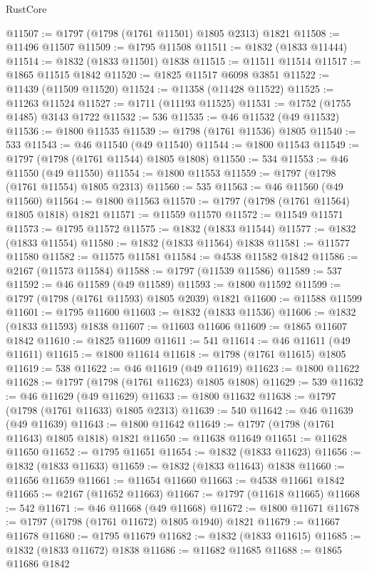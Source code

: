 \begin{lexlean}{RustCore}
\begin{coremodule}
@11507 := @1797 (@1798 (@1761 @11501) @1805 @2313) @1821
@11508 := @11496 @11507
@11509 := @1795 @11508
@11511 := @1832 (@1833 @11444)
@11514 := @1832 (@1833 @11501) @1838
@11515 := @11511 @11514
@11517 := @1865 @11515 @1842
@11520 := @1825 @11517 @6098 @3851
@11522 := @11439 (@11509 @11520)
@11524 := @11358 (@11428 @11522)
@11525 := @11263 @11524
@11527 := @1711 (@11193 @11525)
@11531 := @1752 (@1755 @1485) @3143 @1722
@11532 := 536
@11535 := @46 @11532 (@49 @11532)
@11536 := @1800 @11535
@11539 := @1798 (@1761 @11536) @1805
@11540 := 533
@11543 := @46 @11540 (@49 @11540)
@11544 := @1800 @11543
@11549 := @1797 (@1798 (@1761 @11544) @1805 @1808)
@11550 := 534
@11553 := @46 @11550 (@49 @11550)
@11554 := @1800 @11553
@11559 := @1797 (@1798 (@1761 @11554) @1805 @2313)
@11560 := 535
@11563 := @46 @11560 (@49 @11560)
@11564 := @1800 @11563
@11570 := @1797 (@1798 (@1761 @11564) @1805 @1818) @1821
@11571 := @11559 @11570
@11572 := @11549 @11571
@11573 := @1795 @11572
@11575 := @1832 (@1833 @11544)
@11577 := @1832 (@1833 @11554)
@11580 := @1832 (@1833 @11564) @1838
@11581 := @11577 @11580
@11582 := @11575 @11581
@11584 := @4538 @11582 @1842
@11586 := @2167 (@11573 @11584)
@11588 := @1797 (@11539 @11586)
@11589 := 537
@11592 := @46 @11589 (@49 @11589)
@11593 := @1800 @11592
@11599 := @1797 (@1798 (@1761 @11593) @1805 @2039) @1821
@11600 := @11588 @11599
@11601 := @1795 @11600
@11603 := @1832 (@1833 @11536)
@11606 := @1832 (@1833 @11593) @1838
@11607 := @11603 @11606
@11609 := @1865 @11607 @1842
@11610 := @1825 @11609
@11611 := 541
@11614 := @46 @11611 (@49 @11611)
@11615 := @1800 @11614
@11618 := @1798 (@1761 @11615) @1805
@11619 := 538
@11622 := @46 @11619 (@49 @11619)
@11623 := @1800 @11622
@11628 := @1797 (@1798 (@1761 @11623) @1805 @1808)
@11629 := 539
@11632 := @46 @11629 (@49 @11629)
@11633 := @1800 @11632
@11638 := @1797 (@1798 (@1761 @11633) @1805 @2313)
@11639 := 540
@11642 := @46 @11639 (@49 @11639)
@11643 := @1800 @11642
@11649 := @1797 (@1798 (@1761 @11643) @1805 @1818) @1821
@11650 := @11638 @11649
@11651 := @11628 @11650
@11652 := @1795 @11651
@11654 := @1832 (@1833 @11623)
@11656 := @1832 (@1833 @11633)
@11659 := @1832 (@1833 @11643) @1838
@11660 := @11656 @11659
@11661 := @11654 @11660
@11663 := @4538 @11661 @1842
@11665 := @2167 (@11652 @11663)
@11667 := @1797 (@11618 @11665)
@11668 := 542
@11671 := @46 @11668 (@49 @11668)
@11672 := @1800 @11671
@11678 := @1797 (@1798 (@1761 @11672) @1805 @1940) @1821
@11679 := @11667 @11678
@11680 := @1795 @11679
@11682 := @1832 (@1833 @11615)
@11685 := @1832 (@1833 @11672) @1838
@11686 := @11682 @11685
@11688 := @1865 @11686 @1842

\end{coremodule}
\end{lexlean}
